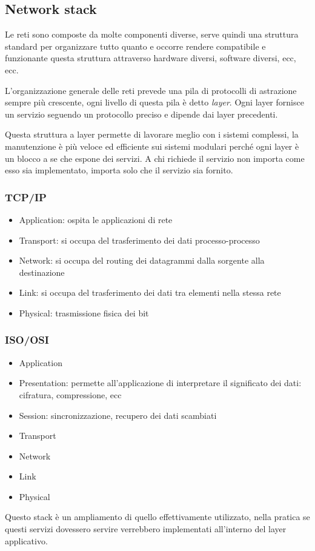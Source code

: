 \subsection{Network stack}
Le reti sono composte da molte componenti diverse, serve quindi una struttura standard per organizzare tutto quanto e occorre rendere compatibile e funzionante questa struttura attraverso hardware diversi, software diversi, ecc, ecc.

L'organizzazione generale delle reti prevede una pila di protocolli di astrazione sempre più crescente, ogni livello di questa pila è detto \emph{layer}.
Ogni layer fornisce un servizio seguendo un protocollo preciso e dipende dai layer precedenti.

Questa struttura a layer permette di lavorare meglio con i sistemi complessi, la manutenzione è più veloce ed efficiente sui sistemi modulari perché ogni layer è un blocco a se che espone dei servizi. A chi richiede il servizio non importa come esso sia implementato, importa solo che il servizio sia fornito.

\subsubsection{TCP/IP}
\begin{itemize}
    \item Application: ospita le applicazioni di rete
    \item Transport: si occupa del trasferimento dei dati processo-processo
    \item Network: si occupa del routing dei datagrammi dalla sorgente alla destinazione
    \item Link: si occupa del trasferimento dei dati tra elementi nella stessa rete
    \item Physical: trasmissione fisica dei bit
\end{itemize}

\subsubsection{ISO/OSI}
\begin{itemize}
    \item Application
    \item Presentation: permette all'applicazione di interpretare il significato dei dati: cifratura, compressione, ecc
    \item Session: sincronizzazione, recupero dei dati scambiati
    \item Transport
    \item Network
    \item Link
    \item Physical
\end{itemize}
Questo stack è un ampliamento di quello effettivamente utilizzato, nella pratica se questi servizi dovessero servire verrebbero implementati all'interno del layer applicativo.

